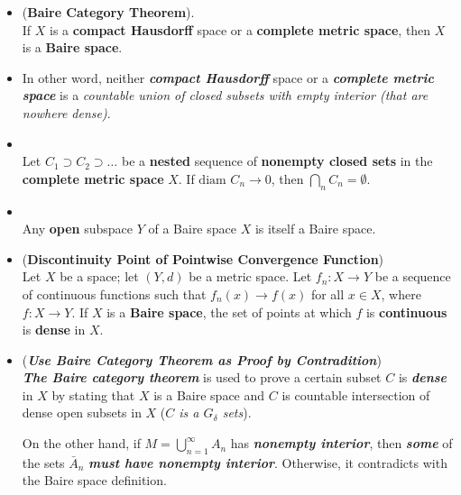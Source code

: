 \documentclass[11pt]{article}
\begin{document}
\begin{itemize}
\item \begin{theorem} (\textbf{Baire Category Theorem}).  \citep{munkres2000topology} \\
If $X$ is a \textbf{compact Hausdorff} space or a \textbf{complete metric space}, then $X$ is a \textbf{Baire space}.
\end{theorem}

\item \begin{remark}
In other word,  neither \textbf{\emph{compact Hausdorff}} space or a \textbf{\emph{complete metric space}} is a \emph{countable union of closed subsets with empty interior (that are nowhere dense)}.
\end{remark}

\item \begin{lemma}\citep{munkres2000topology} \\
Let $C_1 \supset C_2 \supset \ldots$ be a \textbf{nested} sequence of \textbf{nonempty closed sets} in the \textbf{complete metric space} $X$. If $\text{diam }C_n \rightarrow 0$, then $\bigcap_{n}C_n  = \emptyset$.
\end{lemma}

\item \begin{lemma} \citep{munkres2000topology} \\
Any \textbf{open} subspace $Y$ of a Baire space $X$ is itself a Baire space.
\end{lemma}

\item \begin{theorem} (\textbf{Discontinuity Point of Pointwise Convergence Function}) \citep{munkres2000topology} \\
Let $X$ be a space; let $(Y, d)$ be a metric space. Let $f_n : X \rightarrow Y$ be a sequence of continuous functions such that $f_n(x) \rightarrow f(x)$ for all $x \in X$, where $f : X \rightarrow Y$. If $X$ is a \textbf{Baire space}, the set of points at which $f$ is \textbf{continuous} is \textbf{dense} in $X$.
\end{theorem}

\item \begin{remark} (\textbf{\emph{Use Baire Category Theorem as Proof by Contradition}})\\
\emph{\textbf{The Baire category theorem}} is used to prove a certain subset $C$ is \emph{\textbf{dense}} in $X$ by stating that $X$ is a Baire space and $C$ is countable intersection of dense open subsets in $X$ (\emph{$C$ is a $G_{\delta}$ sets}). 

On the other hand, if $M =  \bigcup_{n=1}^{\infty}A_n$ has \emph{\textbf{nonempty interior}}, then \emph{\textbf{some}} of the  sets $\bar{A}_n$ \emph{\textbf{must have nonempty interior}}. Otherwise, it contradicts with the Baire space definition.
\end{remark}
\end{itemize}
\end{document}
